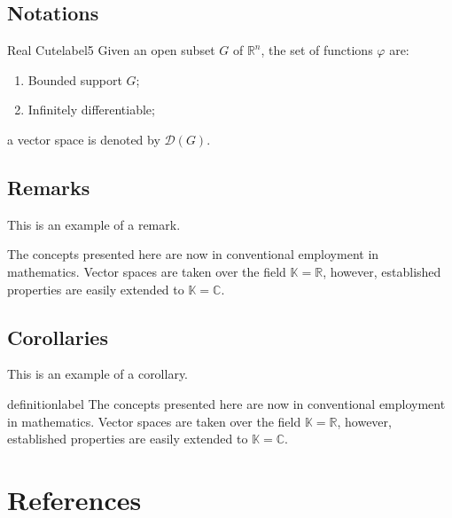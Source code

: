 \documentclass[a4paper,11pt]{report}
\begin{document}

\section{Notations}

\begin{example}{Real Cute}{label5}
	Given an open subset $G$ of $\mathbb{R}^n$, the set of functions $\varphi$ are:
	\begin{enumerate}
		\item Bounded support $G$;
		\item Infinitely differentiable;
	\end{enumerate}
	a vector space is denoted by $\mathcal{D}(G)$. 
\end{example}


\section{Remarks}

This is an example of a remark.

\begin{remark}
	The concepts presented here are now in conventional employment in mathematics. Vector spaces are taken over the field $\mathbb{K}=\mathbb{R}$, however, established properties are easily extended to $\mathbb{K}=\mathbb{C}$.
\end{remark}


\section{Corollaries}

This is an example of a corollary.

\begin{corollary}{definition}{label}
	The concepts presented here are now in conventional employment in mathematics. Vector spaces are taken over the field $\mathbb{K}=\mathbb{R}$, however, established properties are easily extended to $\mathbb{K}=\mathbb{C}$.
\end{corollary}

\nocite{*}

\chapter{References}
\printbibliography[heading=none]
\end{document}
